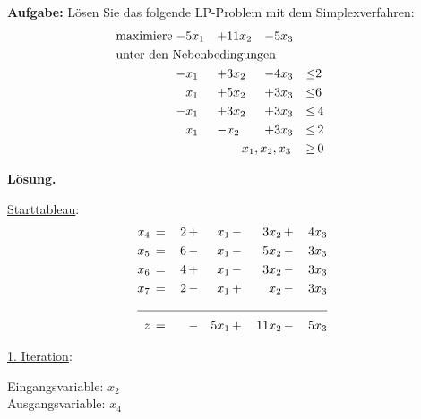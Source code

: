 \documentclass[10pt,a4paper,oneside,ngerman,numbers=noenddot]{scrartcl}
\begin{document}
	\subsection{} %
		\textbf{Aufgabe:} Lösen Sie das folgende LP-Problem mit dem Simplexverfahren:
		\begin{alignat*}{4}
			\text{maximiere}\; -& 5x_{1} &+& 11x_{2} &-& 5x_{3} && \\
			\multicolumn{8}{l}{\text{unter den Nebenbedingungen}} && \\
			\;-& x_{1} &+& 3x_{2} &-& 4x_{3} &\leq & 2 \\
			\;& x_{1} &+& 5x_{2} &+& 3x_{3} &\leq & 6 \\
			\;-& x_{1} &+& 3x_{2} &+& 3x_{3} &\leq &\, 4 \\
			\;& x_{1} &-& x_{2} &+& 3x_{3} &\leq &\, 2 \\			
			\multicolumn{6}{r}{$x_{1}, x_{2}, x_{3}$} \,&\geq &\, 0
		\end{alignat*}
		
		\textbf{Lösung.}
		
		\underline{Starttableau}:
		\begin{alignat*}{5}
			x_{4} \,&=&\, 2 \,&+&\, x_{1} \,&-&\, 3x_{2} \,&+&\, 4x_{3} \\
			x_{5} \,&=&\, 6 \,&-&\, x_{1} \,&-&\, 5x_{2} \,&-&\, 3x_{3} \\
			x_{6} \,&=&\, 4 \,&+&\, x_{1} \,&-&\, 3x_{2} \,&-&\, 3x_{3} \\
			x_{7} \,&=&\, 2 \,&-&\, x_{1} \,&+&\, x_{2} \,&-&\, 3x_{3} \\ \cline{1 - 9}
			z \,&=&\, &-& 5x_{1} \,&+&\, 11x_{2} \,&-&\, 5x_{3}
		\end{alignat*}
		
		\underline{1. Iteration}:
		
		Eingangsvariable: $x_{2}$\\
		Ausgangsvariable: $x_{4}$
		
\end{document}
